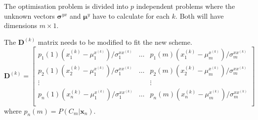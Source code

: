 The optimisation problem is divided into $p$ independent problems where the unknown vectors $\boldsymbol{\sigma}^{yx}$ and $\boldsymbol{\mu}^{y}$ have to calculate for each $k$. Both will have dimensions $m\times 1$.

The $\mathbf{D}^{(k)}$ matrix needs to be modified to fit the new scheme.
\begin{equation}
	\label{eq:D_matrix_new}
	\mathbf{D}^{(k)} = \begin{bmatrix}
		p_1(1)(x_1^{(k)} - \mu_1^{x^{(k)}})/\sigma_1^{xx^{(k)}} & \dots & p_1(m)(x_1^{(k)} - \mu_m^{x^{(k)}})/\sigma_m^{xx^{(k)}} \\
		p_2(1)(x_2^{(k)} - \mu_1^{x^{(k)}})/\sigma_1^{xx^{(k)}} & \dots & p_2(m)(x_2^{(k)} - \mu_m^{x^{(k)}})/\sigma_m^{xx^{(k)}} \\
		\vdots & & \vdots \\
		p_n(1)(x_n^{(k)} - \mu_1^{x^{(k)}})/\sigma_1^{xx^{(k)}} & \dots & p_n(m)(x_n^{(k)} - \mu_m^{x^{(k)}})/\sigma_m^{xx^{(k)}} \\
	\end{bmatrix}
\end{equation}
where $p_n(m)=P(C_m\vert \mathbf{x}_n)$.
